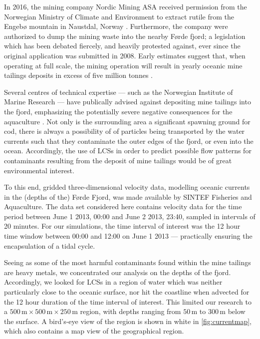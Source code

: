 In 2016, the mining company Nordic Mining ASA received permission from the
Norwegian Ministry of Climate and Environment to extract rutile from the
Engebø mountain in Naustdal, Norway \parencite{garvik2017gruvekonflikten,%
haugan2015sjodeponi}. Furthermore, the company were authorized to dump
the mining waste into the nearby Førde fjord; a legislation which has been
debated fiercely, and heavily protested against, ever since the original
application was submitted in 2008. Early estimates suggest that, when operating
at full scale, the mining operation will result in yearly oceanic mine tailings
deposits in excess of five million tonnes \parencite{garvik2017gruvekonflikten}.

Several centres of technical expertise --- such as the Norwegian Institute of
Marine Research --- have publically advised against depositing mine tailings
into the fjord, emphasizing the potentially severe negative consequences
for the aquaculture \parencite{haugan2015sjodeponi}. Not only is the surrounding
area a significant spawning ground for cod, there is always a possibility of
of particles being transported by the water currents such that they
contaminate the outer edges of the fjord, or even into the ocean. Accordingly,
the use of LCSs in order to predict possible flow patterns for contaminants
resulting from the deposit of mine tailings would be of great environmental
interest.

To this end, gridded three-dimensional velocity data, modelling oceanic
currents in the (depths of the) Førde Fjord, was made available by SINTEF
Fisheries and Aquaculture. The data set considered here contains velocity data
for the time period between June 1 2013, 00:00 and June 2 2013, 23:40, sampled
in intervals of 20 minutes. For our simulations, the time interval of interest
was the 12 hour time window between 00:00 and 12:00 on June 1 2013 ---
practically ensuring the encapsulation of a tidal cycle.

Seeing as some of the most harmful contaminants found within the mine tailings
are heavy metals, we concentrated our analysis on the depths of the fjord.
Accordingly, we looked for LCSs in a region of water which was neither
particularly close to the oceanic surface, nor hit the coastline when
advected for the 12 hour duration of the time interval of interest. This
limited our research to a
$500\,\si{\meter}\times500\,\si{\meter}\times250\,\si{\meter}$ region, with
depths ranging from $50\,\si{\meter}$ to $300\,\si{\meter}$ below the
surface. A bird's-eye view of the region is shown in white in
\cref{fig:currentmap}, which also contains a map view of the geographical
region.

